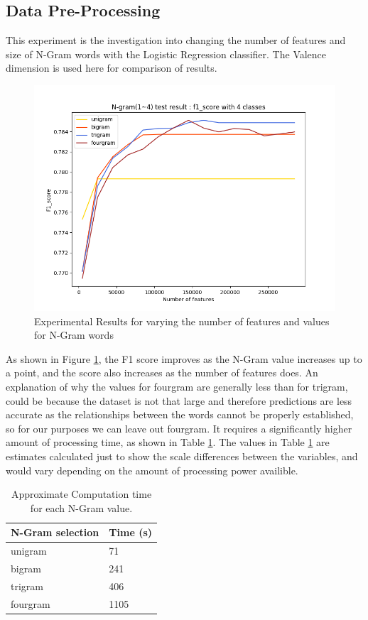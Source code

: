 \subsection{Data Pre-Processing}

This experiment is the investigation into changing the number of features and size of N-Gram words with the Logistic Regression classifier. The Valence dimension is used here for comparison of results.

\begin{figure}[h]
\centering
\includegraphics[scale=0.7]{graphs/nGramBinaryGraph300000.png}
\caption{Experimental Results for varying the number of features and values for N-Gram words}
\label{ngramGraph}
\end{figure}

As shown in Figure \ref{ngramGraph}, the F1 score improves as the N-Gram value increases up to a point, and the score also increases as the number of features does. An explanation of why the values for fourgram are generally less than for trigram, could be because the dataset is not that large and therefore predictions are less accurate as the relationships between the words cannot be properly established, so for our purposes we can leave out fourgram. It requires a significantly higher amount of processing time, as shown in Table \ref{ngram:time}. The values in Table \ref{ngram:time} are estimates calculated just to show the scale differences between the variables, and would vary depending on the amount of processing power availible.

\begin{table}
\centering
\caption{Approximate Computation time for each N-Gram value.}
\begin{tabular}{ |p{3cm}|p{3cm}|}
 \hline
  N-Gram selection & Time (s) \\
 \hline
  unigram & 71\\
  bigram & 241\\
  trigram & 406\\
  fourgram & 1105 \\
 \hline
\end{tabular}
\label{ngram:time}
\end{table}
\pagebreak

